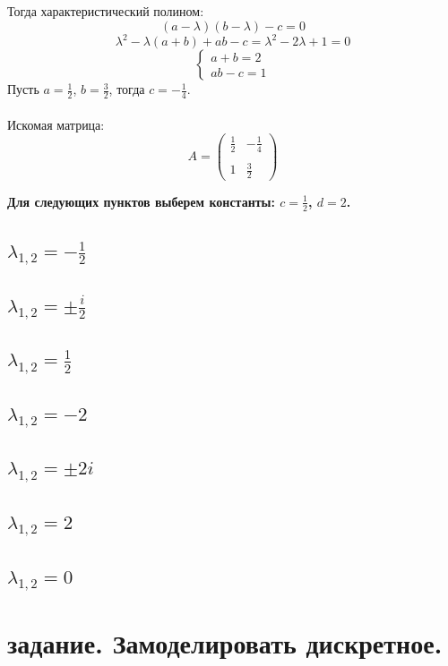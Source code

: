 \documentclass[a5paper, 10pt]{article}
\theoremstyle{definition}
\theoremstyle{plain}
\theoremstyle{remark}
\begin{document}
Тогда характеристический полином:
\begin{equation}
\left( a - \lambda \right) \left( b - \lambda \right) - c = 0
\end{equation}
\begin{equation}
\lambda^ 2 - \lambda (a + b ) + ab - c = \lambda^2 - 2\lambda + 1 = 0
\end{equation}
\begin{equation}
\begin{cases}
a + b = 2\\
ab - c = 1
\end{cases}
\end{equation}
Пусть $a = \frac{1}{2}$, $b = \frac{3}{2}$, тогда $c = -\frac{1}{4}$. \\
\\
Искомая матрица:
\begin{equation}
A =
\begin{pmatrix}
 \frac{1}{2} &   -\frac{1}{4}\\
\\
1 & \frac{3}{2}
\end{pmatrix}
\end{equation}

\newpage
\textbf{Для следующих пунктов выберем константы: $c = \frac{1}{2}$, $d = 2$.}
\\

\subsection{$\lambda_{1, 2} = -\frac{1}{2}$}


\subsection{$\lambda_{1, 2} = \pm \frac{i}{2}$}


\subsection{$\lambda_{1, 2} = \frac{1}{2}$}


\subsection{$\lambda_{1, 2} = -2$}


\subsection{$\lambda_{1, 2} = \pm 2i$}


\subsection{$\lambda_{1, 2} = 2$}



\subsection{$\lambda_{1, 2} = 0$}


\newpage
\section{задание. Замоделировать дискретное.}
\end{document}
